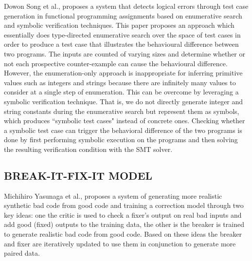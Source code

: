  Dowon Song et al.,\cite{10.1145/3360614} proposes a system that detects logical errors through test case generation in functional programming assignments based on enumerative search and symbolic verification techniques.
 This paper proposes an approach which essentially does type-directed enumerative search over the space of test cases in order to produce a test case that illustrates the behavioural difference between two programs. The inputs are counted of varying sizes and determine whether or not each prospective counter-example can cause the behavioural difference. However, the enumeration-only approach is inappropriate for inferring primitive
values such as integers and strings because there are infinitely many values to consider at a single
step of enumeration. This can be overcome by leveraging a symbolic verification technique.
That is, we do not directly generate integer and string constants during the enumerative search
but represent them as symbols, which produces “symbolic test cases" instead of concrete ones.
Checking whether a symbolic test case can trigger the behavioral difference of the two programs
is done by first performing symbolic execution on the programs and then solving the resulting
verification condition with the SMT solver.
\subsection{ BREAK-IT-FIX-IT MODEL}
Michihiro Yasunaga et al.,\cite{pmlr-v139-yasunaga21a} proposes a system of generating more realistic synthetic bad code from good code and training a correction model through
 two key ideas: one the critic is used to check a fixer’s output on
real bad inputs and add good (fixed) outputs to
the training data, the other is the breaker is trained to
generate realistic bad code from good code. Based
on these ideas the breaker and fixer are iteratively updated  to use them in conjunction to
generate more paired data.

